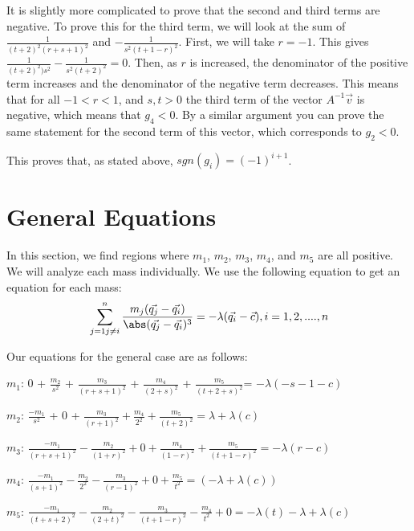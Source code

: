 \documentclass[11pt,leqno]{article}
\theoremstyle{definition}
\theoremstyle{remark}
\numberwithin{equation}{section}
\begin{document}
It is slightly more complicated to prove that the second and third terms are negative. To prove this for the third term, we will look at the sum of $\frac{1}{(t+2)^2(r+s+1)^2}$ and $-\frac{1}{s^2(t+1-r)^2}$. First, we will take $r=-1$. This gives $\frac{1}{(t+2)^2)s^2}-\frac{1}{s^2(t+2)^2}=0$. Then, as $r$ is increased, the denominator of the positive term increases and the denominator of the negative term decreases. This means that for all $-1<r<1$, and $s,t>0$ the third term of the vector $A^{-1}\vec{v}$ is negative, which means that $g_4<0$. By a similar argument you can prove the same statement for the second term of this vector, which corresponds to $g_2<0$.

This proves that, as stated above, $sgn(g_i)=(-1)^{i+1}$.

\section{General Equations}
In this section, we find regions where $m_1$, $m_2$, $m_3$, $m_4$, and $m_5$ are all positive. We will analyze each mass individually. We use the following equation to get an equation for each mass:
\begin{equation}\newline\sum\limits_{j=1j\neq i}^n \frac{m_j(\vec{q_j}-\vec{q_i})}{\abs(\vec{q_j}-\vec{q_i})^3}=-\lambda(\vec{q_i}-\vec{c}),  i=1,2,....,n
\end{equation}

\hspace{3cm}

Our equations for the general case are as follows:
\hspace{3cm}

$m_1$: $0$ + $\frac{m_2}{s^2}$ + $\frac{m_3}{(r+s+1)^2}$ + $\frac{m_4}{(2+s)^2}$ + $\frac{m_5}{(t+2+s)^2}$= $-\lambda(-s-1-c)$ 

$m_2$: $\frac{-m_1}{s^2}$ + 0 + $\frac{m_3}{(r+1)^2} + \frac{m_4}{2^2} + \frac{m_5}{(t+2)^2}= \lambda + \lambda(c)$

$m_3$: $\frac{-m_1}{(r+s+1)^2} -\frac{m_2}{(1+r)^2} + 0 + \frac{m_4}{(1-r)^2} + \frac{m_5}{(t+1-r)^2}=-\lambda(r-c)$

$m_4$: $\frac{-m_1}{(s+1)^2} - \frac{m_2}{2^2} - \frac{m_3}{(r-1)^2} + 0 + \frac{m_5}{t^2} = (-\lambda +\lambda(c))$

$m_5$: $\frac{-m_1}{(t+s+2)^2} - \frac{m_2}{(2+t)^2} - \frac{m_3}{(t+1-r)^2} - \frac{m_4}{t^2} + 0 = -\lambda(t) -\lambda + \lambda(c)$

\hspace{3cm}
\end{document}
